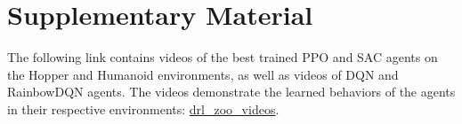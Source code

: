\section{Supplementary Material}
\label{sec:supplementary_material}

The following link contains videos of the best trained PPO and SAC agents on the Hopper and Humanoid environments, as well as videos of DQN and RainbowDQN agents. The videos demonstrate the learned behaviors of the agents in their respective environments: \href{https://upcomillas-my.sharepoint.com/:f:/g/personal/202105547_alu_comillas_edu/IgA7UMEfYKHzQJ_Q-1xnZogYAeznulKbZjneL4hlEnwZOik?e=1SgpjO}{drl\_zoo\_videos}.